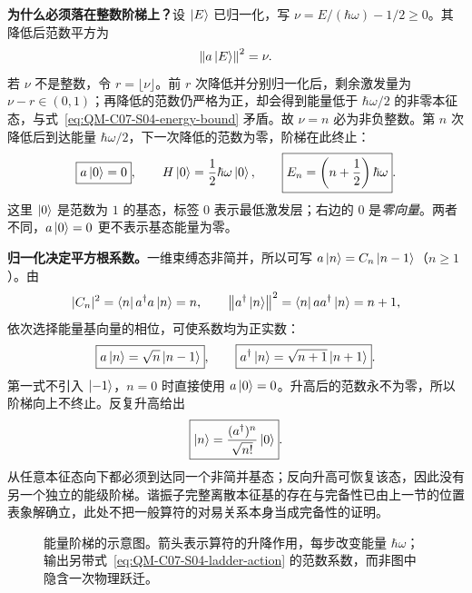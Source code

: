\textbf{为什么必须落在整数阶梯上？}设 $\left|E\right\rangle$ 已归一化，写
$\nu=E/(\hbar\omega)-1/2\ge0$。其降低后范数平方为
\begin{equation}
  \left\lVert a\left|E\right\rangle \right\rVert^2=\nu.
\end{equation}
若 $\nu$ 不是整数，令 $r=\lfloor\nu\rfloor$。前 $r$ 次降低并分别归一化后，剩余激发量为 $\nu-r\in(0,1)$；再降低的范数仍严格为正，却会得到能量低于 $\hbar\omega/2$ 的非零本征态，与式~\eqref{eq:QM-C07-S04-energy-bound} 矛盾。故 $\nu=n$ 必为非负整数。第 $n$ 次降低后到达能量 $\hbar\omega/2$，下一次降低的范数为零，阶梯在此终止：
\begin{equation}
  \boxed{a\left|0\right\rangle=0},\qquad
  H\left|0\right\rangle=\frac12\hbar\omega\left|0\right\rangle,\qquad
  \boxed{E_n=\left(n+\frac12\right)\hbar\omega}.
  \label{eq:QM-C07-S04-spectrum}
\end{equation}
这里 $\left|0\right\rangle$ 是范数为 $1$ 的基态，标签 $0$ 表示最低激发层；右边的 $0$ 是\emph{零向量}。两者不同，$a\left|0\right\rangle=0$ 更不表示基态能量为零。

\textbf{归一化决定平方根系数。}一维束缚态非简并，所以可写
$a\left|n\right\rangle=C_n\left|n-1\right\rangle$（$n\ge1$）。由
\begin{equation}
  |C_n|^2=\left\langle n\right| a^\dagger a\left|n\right\rangle=n,
  \qquad \left\lVert a^\dagger\left|n\right\rangle \right\rVert^2=\left\langle n\right| aa^\dagger\left|n\right\rangle=n+1,
\end{equation}
依次选择能量基向量的相位，可使系数均为正实数：
\begin{equation}
  \boxed{a\left|n\right\rangle=\sqrt n\left|n-1\right\rangle},\qquad
  \boxed{a^\dagger\left|n\right\rangle=\sqrt{n+1}\left|n+1\right\rangle}.
  \label{eq:QM-C07-S04-ladder-action}
\end{equation}
第一式不引入 $\left|-1\right\rangle$，$n=0$ 时直接使用 $a\left|0\right\rangle=0$。升高后的范数永不为零，所以阶梯向上不终止。反复升高给出
\begin{equation}
  \boxed{\left|n\right\rangle=\frac{(a^\dagger)^n}{\sqrt{n!}}\left|0\right\rangle}.
\end{equation}
从任意本征态向下都必须到达同一个非简并基态；反向升高可恢复该态，因此没有另一个独立的能级阶梯。谐振子完整离散本征基的存在与完备性已由上一节的位置表象解确立，此处不把一般算符的对易关系本身当成完备性的证明。

\begin{figure}[htbp]
  \centering
  \caption{能量阶梯的示意图。箭头表示算符的升降作用，每步改变能量 $\hbar\omega$；输出另带式~\eqref{eq:QM-C07-S04-ladder-action} 的范数系数，而非图中隐含一次物理跃迁。}
\end{figure}

